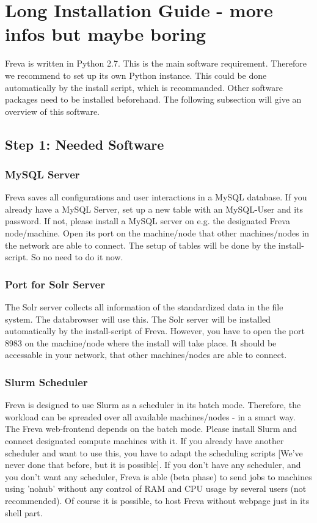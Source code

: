 \documentclass[a4paper,11pt]{ltxdoc}
\begin{document}
\section{Long Installation Guide - more infos but maybe boring}\label{long}
Freva is written in Python 2.7. This is the main software requirement. Therefore we recommend to set up its own Python instance. This could be done automatically by the install script, which is recommanded. Other software packages need to be installed beforehand. The following subsection will give an overview of this software.   

\subsection{Step 1: Needed Software}
\subsubsection{MySQL Server}
Freva saves all configurations and user interactions in a MySQL database. If you already have a MySQL Server, set up a new table with an MySQL-User and its password. If not, please install a MySQL server on e.g. the designated Freva node/machine. Open its port on the machine/node that other machines/nodes in the network are able to connect. The setup of tables will be done by the install-script. So no need to do it now.
\subsubsection{Port for Solr Server}
The Solr server collects all information of the standardized data in the file system. The databrowser will use this. The Solr server will be installed automatically by the install-script of Freva. However, you have to open the port 8983 on the machine/node where the install will take place. It should be accessable in your network, that other machines/nodes are able to connect.
\subsubsection{Slurm Scheduler}
Freva is designed to use Slurm as a scheduler in its batch mode. Therefore, the workload can be spreaded over all available machines/nodes - in a smart way. The Freva web-frontend depends on the batch mode. Please install Slurm and connect designated compute machines with it. If you already have another scheduler and want to use this, you have to adapt the scheduling scripts [We've never done that before, but it is possible]. If you don't have any scheduler, and you don't want any scheduler, Freva is able (beta phase) to send jobs to machines using 'nohub' without any control of RAM and CPU usage by several users (not recommended). Of course it is possible, to host Freva without webpage just in its shell part.
\end{document}
